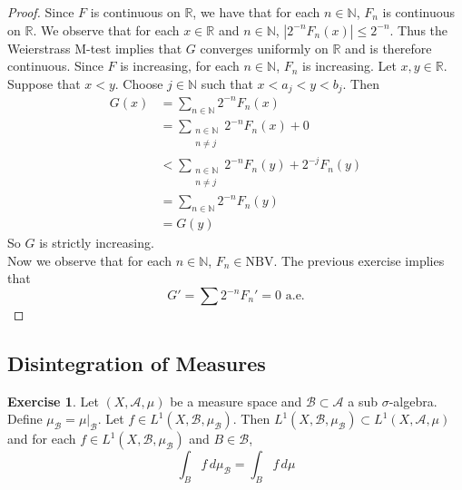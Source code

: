 \documentclass[12pt]{amsart}
\theoremstyle{definition}
\newtheorem{ex}[definition]{Exercise}
\newcommand{\sig}{\sigma}
\newcommand{\N}{\mathbb{N}}
\newcommand{\R}{\mathbb{R}}
\newcommand{\MA}{\mathcal{A}}
\newcommand{\MB}{\mathcal{B}}
\newcommand{\dmu}{\, d \mu}
\newcommand{\NBV}{\text{NBV}}
\newcommand{\lex}[1]{\label{ex:#1}}
\begin{document}
	\begin{proof}
		Since $F$ is continuous on $\R$, we have that for each $n \in \N$, $F_n$ is continuous on $\R$. We observe that for each $x \in \R$ and $n \in \N$, $|2^{-n}F_n(x)| \leq 2^{-n}$. Thus the Weierstrass M-test implies that $G$ converges uniformly on $\R$ and is therefore continuous. Since $F$ is increasing, for each $n \in \N$, $F_n$ is increasing. Let $x, y \in \R$. Suppose that $x<y$. Choose $j \in \N$ such that $x<a_j<y<b_j$. Then 
		\begin{align*}
			G(x) 
			&= \sum_{n \in \N}2^{-n}F_n(x)\\
			&= \sum_{\substack{n \in \N\\ n \neq j}}2^{-n}F_n(x) + 0\\
			& < \sum_{\substack{n \in \N\\ n \neq j}}2^{-n}F_n(y) + 2^{-j}F_n(y)\\
			&=\sum_{n \in \N}2^{-n}F_n(y)\\
			&=G(y)
		\end{align*}
		So $G$ is strictly increasing.\\
		Now we observe that for each $n \in \N$, $F_n \in \NBV$. The previous exercise implies that $$G' = \sum 2^{-n}F_n'=0 \text{ a.e.}$$
	\end{proof}
	
	
	
	
	
	
	
	
	
	
	
	
	
	
	
	
	
	
	
	
	
	
	
	
	
	
	
	
	
	
	
	
	
	
	\newpage
	\subsection{Disintegration of Measures}
	
	\begin{ex} \lex{00000} 
		Let $(X, \MA, \mu)$ be a measure space and $\MB \subset \MA$ a sub $\sig$-algebra. Define $\mu_{\MB} = \mu|_{\MB}$. Let $f \in L^1(X, \MB, \mu_{\MB})$. Then $ L^1(X, \MB, \mu_{\MB}) \subset L^1(X, \MA, \mu)$ and for each $f \in L^1(X, \MB, \mu_{\MB})$ and $B \in \MB$, 
		$$\int_B f \dmu_{\MB} = \int_B f \dmu$$
	\end{ex}
	
\end{document}
